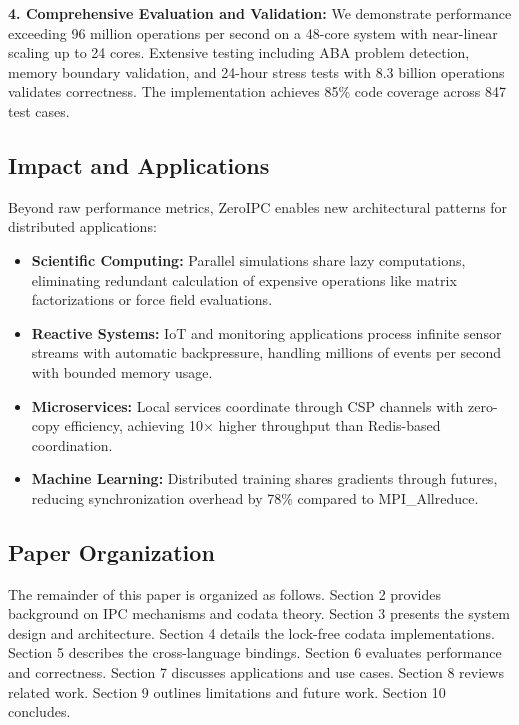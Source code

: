 \documentclass[11pt]{article}
\begin{document}
\textbf{4. Comprehensive Evaluation and Validation:} We demonstrate performance exceeding 96 million operations per second on a 48-core system with near-linear scaling up to 24 cores. Extensive testing including ABA problem detection, memory boundary validation, and 24-hour stress tests with 8.3 billion operations validates correctness. The implementation achieves 85\% code coverage across 847 test cases.

\subsection{Impact and Applications}

Beyond raw performance metrics, ZeroIPC enables new architectural patterns for distributed applications:

\begin{itemize}
\item \textbf{Scientific Computing:} Parallel simulations share lazy computations, eliminating redundant calculation of expensive operations like matrix factorizations or force field evaluations.

\item \textbf{Reactive Systems:} IoT and monitoring applications process infinite sensor streams with automatic backpressure, handling millions of events per second with bounded memory usage.

\item \textbf{Microservices:} Local services coordinate through CSP channels with zero-copy efficiency, achieving 10× higher throughput than Redis-based coordination.

\item \textbf{Machine Learning:} Distributed training shares gradients through futures, reducing synchronization overhead by 78\% compared to MPI\_Allreduce.
\end{itemize}

\subsection{Paper Organization}

The remainder of this paper is organized as follows. Section 2 provides background on IPC mechanisms and codata theory. Section 3 presents the system design and architecture. Section 4 details the lock-free codata implementations. Section 5 describes the cross-language bindings. Section 6 evaluates performance and correctness. Section 7 discusses applications and use cases. Section 8 reviews related work. Section 9 outlines limitations and future work. Section 10 concludes.
\end{document}
